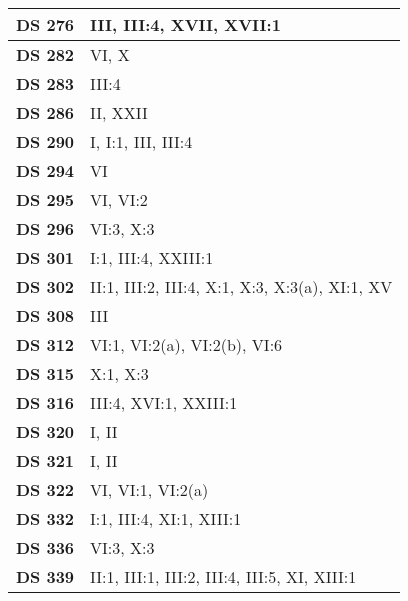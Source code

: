 \begin{xltabular}{\linewidth}{ l | X }
    \textbf {DS 276} & III, III:4, XVII, XVII:1 \\ \hline 
    
    \textbf {DS 282} & VI, X \\ \hline 
    
    \textbf {DS 283} & III:4 \\ \hline 
    
    \textbf {DS 286} & II, XXII \\ \hline 
    
    \textbf {DS 290} & I, I:1, III, III:4 \\ \hline 
    
    \textbf {DS 294} & VI \\ \hline 
    
    \textbf {DS 295} & VI, VI:2 \\ \hline 
    
    \textbf {DS 296} & VI:3, X:3 \\ \hline 
    
    \textbf {DS 301} & I:1, III:4, XXIII:1 \\ \hline 
    
    \textbf {DS 302} & II:1, III:2, III:4, X:1, X:3, X:3(a), XI:1, XV \\ \hline 
    
    \textbf {DS 308} & III \\ \hline 
    
    \textbf {DS 312} & VI:1, VI:2(a), VI:2(b), VI:6 \\ \hline 
    
    \textbf {DS 315} & X:1, X:3 \\ \hline 
    
    \textbf {DS 316} & III:4, XVI:1, XXIII:1 \\ \hline 
    
    \textbf {DS 320} & I, II \\ \hline 
    
    \textbf {DS 321} & I, II \\ \hline 
    
    \textbf {DS 322} & VI, VI:1, VI:2(a) \\ \hline 
    
    \textbf {DS 332} & I:1, III:4, XI:1, XIII:1 \\ \hline 
    
    \textbf {DS 336} & VI:3, X:3 \\ \hline 
    
    \textbf {DS 339} & II:1, III:1, III:2, III:4, III:5, XI, XIII:1 \\ \hline 
    

\end{xltabular}
